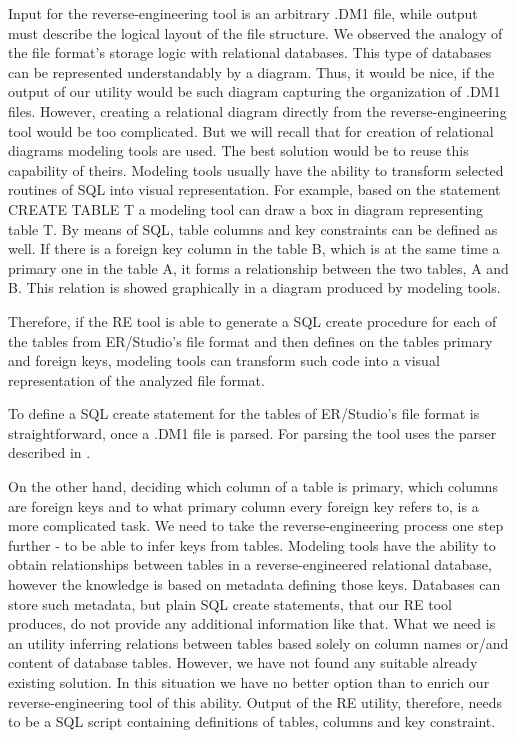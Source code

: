Input for the reverse-engineering tool is an arbitrary .DM1 file, while output must describe the logical layout of the file structure.
We observed the analogy of the file format's storage logic with relational databases. 
This type of databases can be represented understandably by a diagram.
Thus, it would be nice, if the output of our utility would be such diagram capturing the organization of .DM1 files.
However, creating a relational diagram directly from the reverse-engineering tool would be too complicated. But we will recall that for creation of relational diagrams modeling tools are used. The best solution would be to reuse this capability of theirs.
Modeling tools usually have the ability to transform selected routines of SQL into visual representation.
For example, based on the statement CREATE TABLE T a modeling tool can draw a box in diagram representing table T. 
By means of SQL, table columns and key constraints can be defined as well.
If there is a foreign key column in the table B, which is at the same time a primary one in the table A, it forms a relationship between the two tables, A and B. This relation is showed graphically in a diagram produced by modeling tools.

Therefore, if the RE tool is able to generate a SQL create procedure for each of the tables from ER/Studio's file format and then defines on the tables primary and foreign keys, modeling tools can transform such code into a visual representation of the analyzed file format.

To define a SQL create statement for the tables of ER/Studio's file format is straightforward, once a .DM1 file is parsed. For parsing the tool uses the parser described in .

On the other hand, deciding which column of a table is primary, which columns are foreign keys and to what primary column every foreign key refers to, is a more complicated task.
We need to take the reverse-engineering process one step further - to be able to infer keys from tables.
Modeling tools have the ability to obtain relationships between tables in a reverse-engineered relational database, however the knowledge is based on metadata defining those keys. Databases can store such metadata, but plain SQL create statements, that our RE tool produces, do not provide any additional information like that.
What we need is an utility inferring relations between tables based solely on column names or/and content of database tables. However, we have not found any suitable already existing solution.
In this situation we have no better option than to enrich our reverse-engineering tool of this ability.
Output of the RE utility, therefore, needs to be a SQL script containing definitions of tables, columns and key constraint.

